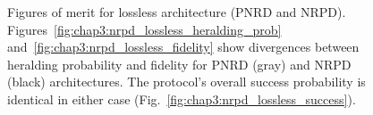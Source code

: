 \documentclass[aps,twocolumn,secnumarabic,amsmath,amssymb,pra,groupedaddress,
showpacs, showkeys,draft]{revtex4-1}
\begin{document}
\begin{figure}[t]
\centering
{}

\caption{\label{fig:chap3:nrpd_lossless}Figures of merit for lossless architecture (PNRD and NRPD). Figures~\ref{fig:chap3:nrpd_lossless_heralding_prob} and~\ref{fig:chap3:nrpd_lossless_fidelity} show divergences between heralding probability and fidelity for PNRD (gray) and NRPD (black) architectures. The protocol's overall success probability is identical in either case (Fig.~\ref{fig:chap3:nrpd_lossless_success}).}
\end{figure}
\end{document}
